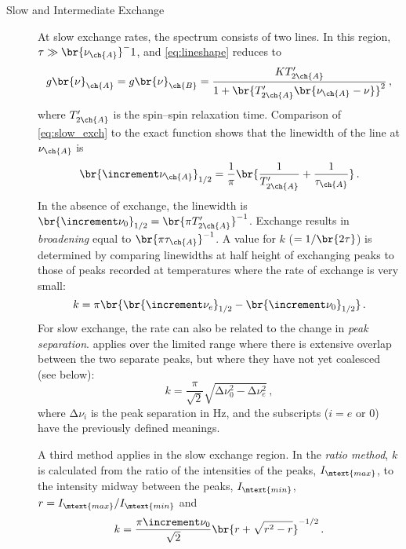 \begin{description}
	\item[Slow and Intermediate Exchange] 
At slow exchange rates, the spectrum consists of two lines. 
In this region, \( \tau \gg \br{\nu_{\ch{A}}}^-1 \), and \cref{eq:lineshape} reduces to 
\begin{equation}
  g\br{\nu}_{\ch{A}} = g\br{\nu}_{\ch{B}} = \frac{K T'_{2\ch{A}}}{1 + \br{T'_{2\ch{A}} \br{\nu_{\ch{A}} - \nu}}^2} \, ,
  \label{eq:slow_exch_peak}
\end{equation}
where \( T'_{2\ch{A}} \) is the spin--spin relaxation time. 
Comparison of \cref{eq:slow_exch} to the exact function shows that the linewidth of the line at \( \nu_{\ch{A}} \) is
\begin{equation}
  \br{\increment \nu_{\ch{A}}}_{1/2} = \frac{1}{\pi} \br{\frac{1}{T'_{2\ch{A}}} + \frac{1}{\tau_{\ch{A}}}} \, .
  \label{eq:slow_exch_width}
\end{equation}
In the absence of exchange, the linewidth is \( \br{\increment \nu_0}_{1/2} = \br{\pi T'_{2\ch{A}}}^{-1} \). 
Exchange results in \emph{broadening} equal to \( \br{\pi \tau_{\ch{A}}}^{-1} \). 
A value for \( k \) (\( =1/\br{2\tau} \)) is determined by comparing linewidths at half height of exchanging peaks to those of peaks recorded at temperatures where the rate of exchange is very small:
\begin{equation}
  k = \pi \br{\br{\increment \nu_e}_{1/2} - \br{\increment \nu_0}_{1/2}} \, .
  \label{eq:slow_exch_k_1}
\end{equation}
For slow exchange, the rate can also be related to the change in \emph{peak separation}. 
 applies over the limited range where there is extensive overlap between the two separate peaks, but where they have not yet coalesced (see below):
\begin{equation}
  k = \frac{\pi}{\sqrt{2}} \sqrt{\increment \nu_0^2 - \increment \nu_e^2} \, ,
  \label{eq:slow_exch_k_2}
\end{equation}
where \( \increment\nu_i \) is the peak separation in \si{\Hz}, and the subscripts (\( i = e \) or \num{0}) have the previously defined meanings.

A third method applies in the slow exchange region. 
In the \emph{ratio method}, \( k \) is calculated from the ratio of the intensities of the peaks, \( I_\mtext{max} \), to the intensity midway between the peaks, \( I_\mtext{min} \), \( r = I_\mtext{max} / I_\mtext{min} \) and 
\begin{equation}
  k = \frac{\pi \increment \nu_0}{\sqrt{2}} \br{ r + \sqrt{ r^2 - r}}^{-1/2} \, .
  \label{eq:slow_exch_k_3}
\end{equation}


\end{description}
